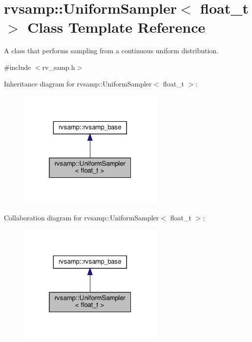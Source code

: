 \hypertarget{classrvsamp_1_1UniformSampler}{}\section{rvsamp\+:\+:Uniform\+Sampler$<$ float\+\_\+t $>$ Class Template Reference}
\label{classrvsamp_1_1UniformSampler}


A class that performs sampling from a continuous uniform distribution.  




{\ttfamily \#include $<$rv\+\_\+samp.\+h$>$}



Inheritance diagram for rvsamp\+:\+:Uniform\+Sampler$<$ float\+\_\+t $>$\+:\nopagebreak
\begin{figure}[H]
\begin{center}
\leavevmode
\includegraphics[width=205pt]{classrvsamp_1_1UniformSampler__inherit__graph}
\end{center}
\end{figure}


Collaboration diagram for rvsamp\+:\+:Uniform\+Sampler$<$ float\+\_\+t $>$\+:\nopagebreak
\begin{figure}[H]
\begin{center}
\leavevmode
\includegraphics[width=205pt]{classrvsamp_1_1UniformSampler__coll__graph}
\end{center}
\end{figure}
